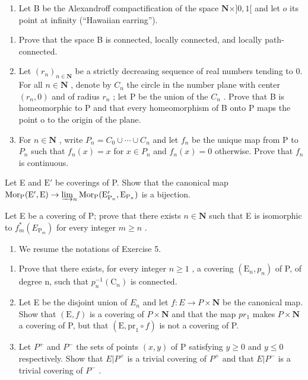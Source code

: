 \begin{enumerate}
\def\labelenumi{\arabic{enumi})}
\setcounter{enumi}{4}
\tightlist
\item
  Let B be the Alexandroff compactification of the space \(\mathbf{N} \times ]0,1[\) and let \(o\) its point at infinity (“Hawaiian earring”).
\end{enumerate}

\begin{enumerate}
\def\labelenumi{\alph{enumi})}
\item
  Prove that the space B is connected, locally connected, and locally path-connected.
\item
  Let \((r_{n})_{n\in\mathbf{N}}\) be a strictly decreasing sequence of real numbers tending to 0. For all \(n\in\mathbf{N}\) , denote by \(C_{n}\) the circle in the number plane with center \((r_{n},0)\) and of radius \(r_{n}\) ; let P be the union of the \(C_{n}\) . Prove that B is homeomorphic to P and that every homeomorphism of B onto P maps the point o to the origin of the plane.
\item
  For \(n \in \mathbf{N}\) , write \(P_{n} = C_{0} \cup \cdots \cup C_{n}\) and let \(f_{n}\) be the unique map from P to \(P_{n}\) such that \(f_{n}(x) = x\) for \(x \in P_{n}\) and \(f_{n}(x) = 0\) otherwise. Prove that \(f_{n}\) is continuous.
\end{enumerate}

Let E and \(\mathrm{E}'\) be coverings of P. Show that the canonical map \(\mathrm{Mor}_{\mathrm{P}}(\mathrm{E}',\mathrm{E})\to \varinjlim_{n}\mathrm{Mor}_{\mathrm{P}}(\mathrm{E}_{\mathrm{P}_n}',\mathrm{E}_{\mathrm{P}_n})\) is a bijection.

Let E be a covering of P; prove that there exists \(n \in \mathbf{N}\) such that E is isomorphic to \(f_{m}^{*}(E_{\mathrm{P}_{m}})\) for every integer \(m \geqslant n\) .

\begin{enumerate}
\def\labelenumi{\arabic{enumi})}
\setcounter{enumi}{5}
\tightlist
\item
  We resume the notations of Exercise 5.
\end{enumerate}

\begin{enumerate}
\def\labelenumi{\alph{enumi})}
\item
  Prove that there exists, for every integer \(n \geqslant 1\) , a covering \((\mathrm{E}_{n}, p_{n})\) of P, of degree n, such that \(p_{n}^{-1}(\mathrm{C}_{n})\) is connected.
\item
  Let E be the disjoint union of \(E_{n}\) and let \(f: E \to P \times \mathbf{N}\) be the canonical map. Show that \((\mathrm{E}, f)\) is a covering of \(P \times \mathbf{N}\) and that the map \(pr_{1}\) makes \(P \times \mathbf{N}\) a covering of P, but that \((\mathrm{E}, \mathrm{pr}_{1} \circ f)\) is not a covering of P.
\item
  Let \(P^{+}\) and \(P^{-}\) the sets of points \((x,y)\) of P satisfying \(y \geqslant 0\) and \(y \leqslant 0\) respectively. Show that \(E|P^{+}\) is a trivial covering of \(P^{+}\) and that \(E|P^{-}\) is a trivial covering of \(P^{-}\) .
\end{enumerate}

